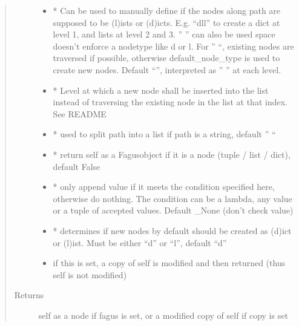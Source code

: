 \documentclass[a4paper,10pt,english]{sphinxmanual}
\begin{document}
\begin{fulllineitems}
\begin{fulllineitems}
\begin{quote}
\begin{description}
\begin{itemize}
\item {}
\sphinxAtStartPar
{} \textendash{} * Can be used to manually define if the nodes along path are supposed to be (l)ists or
(d)icts. E.g. “dll” to create a dict at level 1, and lists at level 2 and 3. ” ” can also be used \sphinxhyphen{}
space doesn’t enforce a node\sphinxhyphen{}type like d or l. For ” “, existing nodes are traversed if possible,
otherwise default\_node\_type is used to create new nodes. Default “”, interpreted as ” ” at each level.

\item {}
\sphinxAtStartPar
{} \textendash{} * Level at which a new node shall be inserted into the list instead of traversing the
existing node in the list at that index. See README

\item {}
\sphinxAtStartPar
{} \textendash{} * used to split path into a list if path is a string, default ” “

\item {}
\sphinxAtStartPar
{} \textendash{} * return self as a Fagus\sphinxhyphen{}object if it is a node (tuple / list / dict), default False

\item {}
\sphinxAtStartPar
{} \textendash{} * only append value if it meets the condition specified here, otherwise do nothing. The condition can
be a lambda, any value or a tuple of accepted values. Default \_None (don’t check value)

\item {}
\sphinxAtStartPar
{} \textendash{} * determines if new nodes by default should be created as (d)ict or (l)ist. Must be
either “d” or “l”, default “d”

\item {}
\sphinxAtStartPar
{} \textendash{} if this is set, a copy of self is modified and then returned (thus self is not modified)

\end{itemize}

\item[{Returns}] \leavevmode
\sphinxAtStartPar
self as a node if fagus is set, or a modified copy of self if copy is set


\end{description}
\end{quote}
\end{fulllineitems}
\end{fulllineitems}
\end{document}
